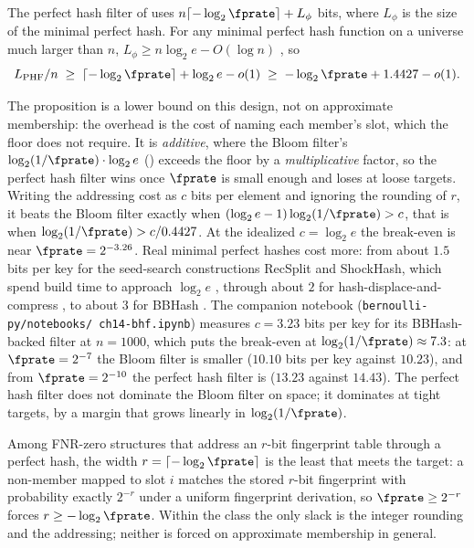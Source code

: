 \begin{proposition}
\label{prop:phf-space}
The perfect hash filter of  uses $n \lceil -\log_2 \fprate
\rceil + L_{\phi}$ bits, where $L_{\phi}$ is the size of the minimal
perfect hash. For any minimal perfect hash function on a universe much
larger than $n$, $L_{\phi} \ge n \log_2 e - O(\log n)$
\parencite{fredman-komlos-1984}, so
\[
  L_{\text{PHF}} / n
  \;\ge\; \lceil -\log_2 \fprate \rceil + \log_2 e - o(1)
  \;\ge\; -\log_2 \fprate + 1.4427 - o(1).
\]
\end{proposition}

The proposition is a lower bound on this design, not on approximate
membership: the overhead is the cost of naming each member's slot, which
the floor does not require. It is \emph{additive}, where the Bloom
filter's $\log_2(1/\fprate) \cdot \log_2 e$ ()
exceeds the floor by a \emph{multiplicative} factor, so the perfect hash
filter wins once $\fprate$ is small enough and loses at loose targets.
Writing the addressing cost as $c$ bits per element and ignoring the
rounding of $r$, it beats the Bloom filter exactly when $(\log_2 e - 1)
\log_2(1/\fprate) > c$, that is when $\log_2(1/\fprate) > c / 0.4427$.
At the idealized $c = \log_2 e$ the break-even is near $\fprate =
2^{-3.26}$. Real minimal perfect hashes cost more: from about $1.5$ bits
per key for the seed-search constructions RecSplit and ShockHash, which
spend build time to approach $\log_2 e$
\parencite{esposito-graf-vigna-2020,lehmann-sanders-walzer-2024}, through
about $2$ for hash-displace-and-compress \parencite{belazzougui-2009}, to
about $3$ for BBHash \parencite{limasset-et-al-2017}. The companion
notebook (\texttt{bernoulli-py/\allowbreak notebooks/\allowbreak
ch14-bhf.ipynb}) measures $c = 3.23$ bits per key for its BBHash-backed
filter at $n = 1000$, which puts the break-even at $\log_2(1/\fprate)
\approx 7.3$: at $\fprate = 2^{-7}$ the Bloom filter is smaller ($10.10$
bits per key against $10.23$), and from $\fprate = 2^{-10}$ the perfect
hash filter is ($13.23$ against $14.43$). The perfect hash filter does
not dominate the Bloom filter on space; it dominates at tight targets,
by a margin that grows linearly in $\log_2(1/\fprate)$.

\begin{remark}
\label{rem:bhf-class-optimal}
Among FNR-zero structures that address an $r$-bit fingerprint table
through a perfect hash, the width $r = \lceil -\log_2 \fprate \rceil$ is
the least that meets the target: a non-member mapped to slot $i$ matches
the stored $r$-bit fingerprint with probability exactly $2^{-r}$ under a
uniform fingerprint derivation, so $\fprate \ge 2^{-r}$ forces $r \ge
-\log_2 \fprate$. Within the class the only slack is the integer rounding
and the addressing; neither is forced on approximate membership in
general.
\end{remark}

